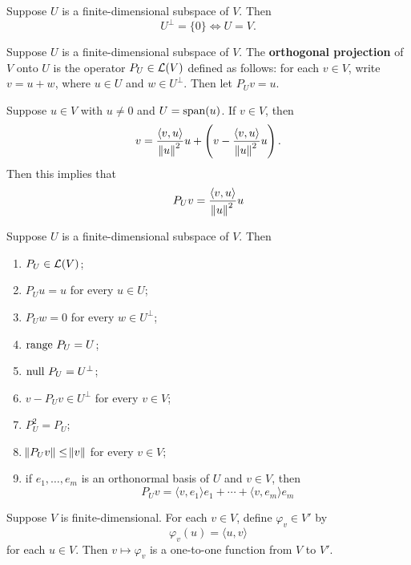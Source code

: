 \documentclass{extarticle}
\begin{document}
\begin{corollary}
    Suppose \(U\) is a finite-dimensional subspace of \(V\). Then 
    \[U^\perp = \{0\} \Longleftrightarrow U = V.\]
\end{corollary}

\begin{definition}
    Suppose \(U\) is a finite-dimensional subspace of \(V\). The \textbf{orthogonal projection} of \(V\) 
    onto \(U\) is the operator \(P_U \in \mathcal{L}(V)\) defined as follows: for each \(v \in V\), write \(v = u + w\), 
    where \(u \in U\) and \(w \in U^\perp\). Then let \(P_U v = u\).
\end{definition}

\begin{remark}
    Suppose \(u \in V\) with \(u \neq 0\) and \(U = \text{span}(u)\). If \(v \in V\), then 
    \[v = \frac{\langle v,u \rangle}{\norm{u}^2}u + \left(v - \frac{\langle v,u \rangle}{\norm{u}^2}u \right).\]
    Then this implies that 
    \[P_U v = \frac{\langle v,u \rangle}{\norm{u}^2}u\]
\end{remark}

\begin{corollary}
    Suppose \(U\) is a finite-dimensional subspace of \(V\). Then 
    \begin{enumerate}[label=(\alph*)]
        \item \(P_U \in \mathcal{L}(V)\); 
        \item \(P_U u = u\) for every \(u \in U\); 
        \item \(P_U w = 0\) for every \(w \in U^\perp\); 
        \item \(\text{range } P_U = U\); 
        \item \(\text{null } P_U = U^\perp\);  
        \item \(v - P_Uv \in U^\perp\) for every \(v \in V\); 
        \item \(P_U^2 = P_U\); 
        \item \(\norm{P_U v} \leq \norm{v}\) for every \(v \in V\); 
        \item if \(e_1, \ldots, e_m\) is an orthonormal basis of \(U\) and \(v \in V\), then 
        \[P_U v = \langle v,e_1 \rangle e_1 + \cdots + \langle v,e_m \rangle e_m\]
    \end{enumerate}
\end{corollary}

\begin{thm}
    Suppose \(V\) is finite-dimensional. For each \(v \in V\), define \(\varphi_v \in V'\) by 
    \[\varphi_v (u) = \langle u,v \rangle\]
    for each \(u \in V\). Then \(v \mapsto \varphi_v\) is a one-to-one function from \(V\) to 
    \(V'\).
\end{thm}
\end{document}
